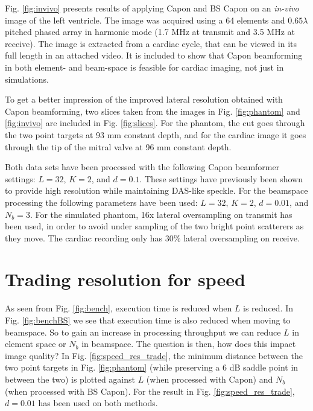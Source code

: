 \documentclass[journal]{IEEEtran}
\begin{document}
Fig. \ref{fig:invivo} presents results of applying Capon and BS Capon on an \textit{in-vivo} image of the left ventricle. The image was acquired using a 64 elements and $0.65\lambda$ pitched phased array in harmonic mode (1.7 MHz at transmit and 3.5 MHz at receive). The image is extracted from a cardiac cycle, that can be viewed in its full length in an attached video. It is included to show that Capon beamforming in both element- and beam-space is feasible for cardiac imaging, not just in simulations.

To get a better impression of the improved lateral resolution obtained with Capon beamforming, two slices taken from the images in Fig. \ref{fig:phantom} and \ref{fig:invivo} are included in Fig. \ref{fig:slices}. For the phantom, the cut goes through the two point targets at 93 mm constant depth, and for the cardiac image it goes through the tip of the mitral valve at 96 mm constant depth.

Both data sets have been processed with the following Capon beamformer settings: $L = 32$, $K = 2$, and $d=0.1$. These settings have previously been shown to provide high resolution while maintaining DAS-like speckle\cite{Synnevag2007a}. For the beamspace processing the following parameters have been used: $L=32$, $K=2$, $d=0.01$, and $N_b=3$. For the simulated phantom, 16x lateral oversampling on transmit has been used, in order to avoid under sampling of the two bright point scatterers as they move. The cardiac recording only has $30\%$ lateral oversampling on receive.

\section{Trading resolution for speed}\label{sec:trade}
As seen from Fig. \ref{fig:bench}, execution time is reduced when $L$ is reduced. In Fig. \ref{fig:benchBS} we see that execution time is also reduced when moving to beamspace. So to gain an  increase in processing throughput we can reduce $L$ in element space or $N_b$ in beamspace. The question is then, how does this impact image quality? In Fig. \ref{fig:speed_res_trade}, the minimum distance between the two point targets in Fig. \ref{fig:phantom} (while preserving a 6 dB saddle point in between the two) is plotted against $L$ (when processed with Capon) and $N_b$ (when processed with BS Capon). For the result in Fig. \ref{fig:speed_res_trade}, $d=0.01$ has been used on both methods.
\end{document}
